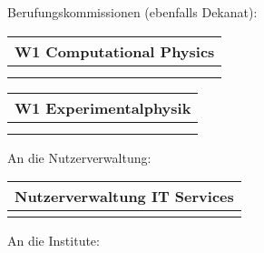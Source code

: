 \documentclass[a4paper, 14pt]{article}
\begin{document}
\clearpage

Berufungskommissionen (ebenfalls Dekanat):

\begin{table}[h!]

\begin{tabular}{|p{5cm}|p{5cm}|p{5cm}|p{5cm}|} \hline
	\multicolumn{4}{|c|}{\textbf{W1 Computational Physics}} \\ \hline
	& \censor{} &  & \censor{}\\ 
	& \censor{} &  & \censor{}\\  \hline
\end{tabular}
\vspace{0,5cm}

\begin{tabular}{|p{5cm}|p{5cm}|p{5cm}|p{5cm}|} \hline
	\multicolumn{4}{|c|}{\textbf{W1 Experimentalphysik}} \\ \hline
	& \censor{} &  & \censor{}\\ 
	& \censor{} &  & \censor{}\\  \hline
\end{tabular}

\end{table}

An die Nutzerverwaltung:

\begin{table}[h!]
	\centering
	
	\begin{tabular}{|p{5cm}|p{5cm}|p{5cm}|p{5cm}|} \hline
		\multicolumn{4}{|c|}{\textbf{Nutzerverwaltung IT Services}} \\ \hline
		& \censor{} &  & \censor{}\\  \hline
	\end{tabular}
	\vspace{0,5cm}
	
\end{table}

An die Institute:
\end{document}
